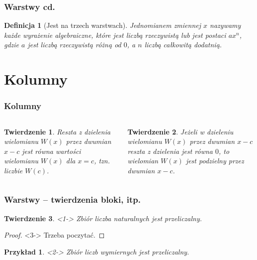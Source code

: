 \documentclass[10pt,xcolor={dvipsnames}]{beamer}
\newtheorem{twierdzenie}{Twierdzenie}
\newtheorem{definicja}{Definicja}
\newtheorem{przyklad}{Przykład}
\begin{document}
\begin{frame}
\frametitle{Warstwy cd.}
\begin{definicja}[Jest na trzech warstwach]
Jednomianem zmiennej $x$ nazywamy każde wyrażenie algebraiczne, które jest liczbą rzeczywistą lub jest postaci $ax^n$, gdzie $a$ jest liczbą rzeczywistą różną od $0$, a $n$ liczbą całkowitą dodatnią. 
\end{definicja}
\end{frame}


\section{Kolumny}


\begin{frame}
\frametitle{Kolumny}
\begin{columns}
\begin{twierdzenie}
Reszta z dzielenia wielomianu $W(x)$ przez dwumian $x-c$ jest równa wartości wielomianu $W(x)$ dla $x=c$, tzn. liczbie $W(c)$.
\end{twierdzenie}
\begin{twierdzenie}
Jeżeli w dzieleniu wielomianu $W(x)$ przez dwumian $x-c$ reszta z dzielenia jest równa $0$, to wielomian $W(x)$ jest podzielny przez dwumian $x-c$.
\end{twierdzenie}
\end{columns}
\end{frame}









\begin{frame}
  \frametitle{Warstwy -- twierdzenia bloki, itp.}
  \begin{twierdzenie}<1->
    Zbiór liczba naturalnych jest przeliczalny.
  \end{twierdzenie}
  \begin{proof}<3->
    Trzeba poczytać.
  \end{proof}
  \begin{przyklad}<2->
    Zbiór liczb wymiernych jest przeliczalny.
  \end{przyklad}
\end{frame}
\end{document}
